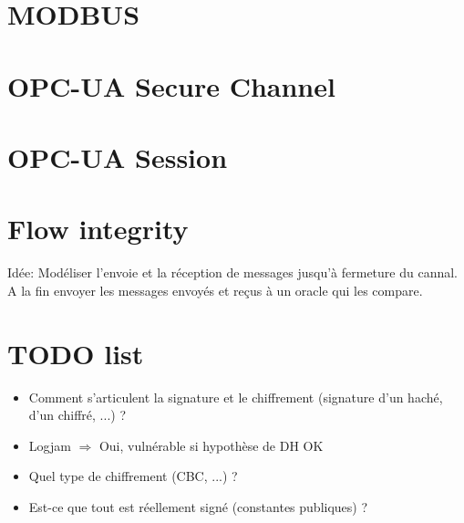 \documentclass{article}
\begin{document}
\section{MODBUS}

\section{OPC-UA Secure Channel}


\section{OPC-UA Session}


\section{Flow integrity}
Idée: Modéliser l'envoie et la réception de messages jusqu'à fermeture du cannal.
A la fin envoyer les messages envoyés et reçus à un oracle qui les compare.

\section{TODO list}

\begin{itemize}
    \item Comment s'articulent la signature et le chiffrement (signature d'un haché, d'un chiffré, ...) ?
    \item Logjam $\Rightarrow$ Oui, vulnérable si hypothèse de DH OK
    \item Quel type de chiffrement (CBC, ...) ?
    \item Est-ce que tout est réellement signé (constantes publiques) ?
\end{itemize}
\end{document}
